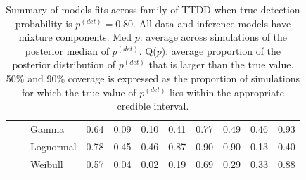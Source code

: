 \documentclass[useAMS,usenatbib,referee,12pt]{article}
\newcommand{\pdet}{p^{(det)}}
\begin{document}
\begin{table}[ht]
\begin{tabular}{l|l|l|cccc|cccc}
\cline{2-11}
& \parbox[t]{2mm}{} & Gamma & 0.64 & 0.09 & 0.10 & 0.41 & 0.77 & 0.49 & 0.46 & 0.93 \\ 
   &  & Lognormal & 0.78 & 0.45 & 0.46 & 0.87 & 0.90 & 0.90 & 0.13 & 0.40 \\ 
   &  & Weibull & 0.57 & 0.04 & 0.02 & 0.19 & 0.69 & 0.29 & 0.33 & 0.88 \\ 
   \hline
\end{tabular}
\caption{Summary of models fits across family of TTDD when true detection probability is $\pdet = 0.80$.
All data and inference models have mixture components.
Med $p$: average across simulations of the posterior median of $\pdet$.  
Q($p$): average proportion of the posterior distribution of $\pdet$ that is larger than the true value.  
50\% and 90\% coverage is expressed as the proportion of simulations for which the true value of $\pdet$ lies within the appropriate credible interval.}
\label{tbl:fam80}

\vspace{0.5cm}


\end{table}
\end{document}
